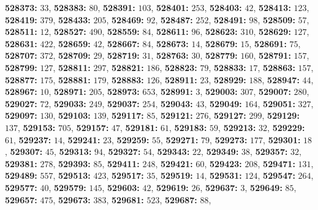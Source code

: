 \textsf{\bfseries 528373:} $33$, \textsf{\bfseries 528383:} $80$, \textsf{\bfseries 528391:} $103$, \textsf{\bfseries 528401:} $253$, \textsf{\bfseries 528403:} $42$, \textsf{\bfseries 528413:} $123$, \textsf{\bfseries 528419:} $379$, \textsf{\bfseries 528433:} $205$, \textsf{\bfseries 528469:} $92$, \textsf{\bfseries 528487:} $252$, \textsf{\bfseries 528491:} $98$, \textsf{\bfseries 528509:} $57$, \textsf{\bfseries 528511:} $12$, \textsf{\bfseries 528527:} $490$, \textsf{\bfseries 528559:} $84$, \textsf{\bfseries 528611:} $96$, \textsf{\bfseries 528623:} $310$, \textsf{\bfseries 528629:} $127$, \textsf{\bfseries 528631:} $422$, \textsf{\bfseries 528659:} $42$, \textsf{\bfseries 528667:} $84$, \textsf{\bfseries 528673:} $14$, \textsf{\bfseries 528679:} $15$, \textsf{\bfseries 528691:} $75$, \textsf{\bfseries 528707:} $372$, \textsf{\bfseries 528709:} $29$, \textsf{\bfseries 528719:} $31$, \textsf{\bfseries 528763:} $30$, \textsf{\bfseries 528779:} $160$, \textsf{\bfseries 528791:} $157$, \textsf{\bfseries 528799:} $127$, \textsf{\bfseries 528811:} $297$, \textsf{\bfseries 528821:} $186$, \textsf{\bfseries 528823:} $79$, \textsf{\bfseries 528833:} $17$, \textsf{\bfseries 528863:} $157$, \textsf{\bfseries 528877:} $175$, \textsf{\bfseries 528881:} $179$, \textsf{\bfseries 528883:} $126$, \textsf{\bfseries 528911:} $23$, \textsf{\bfseries 528929:} $188$, \textsf{\bfseries 528947:} $44$, \textsf{\bfseries 528967:} $10$, \textsf{\bfseries 528971:} $205$, \textsf{\bfseries 528973:} $653$, \textsf{\bfseries 528991:} $3$, \textsf{\bfseries 529003:} $307$, \textsf{\bfseries 529007:} $280$, \textsf{\bfseries 529027:} $72$, \textsf{\bfseries 529033:} $249$, \textsf{\bfseries 529037:} $254$, \textsf{\bfseries 529043:} $43$, \textsf{\bfseries 529049:} $164$, \textsf{\bfseries 529051:} $327$, \textsf{\bfseries 529097:} $130$, \textsf{\bfseries 529103:} $139$, \textsf{\bfseries 529117:} $85$, \textsf{\bfseries 529121:} $276$, \textsf{\bfseries 529127:} $299$, \textsf{\bfseries 529129:} $137$, \textsf{\bfseries 529153:} $705$, \textsf{\bfseries 529157:} $47$, \textsf{\bfseries 529181:} $61$, \textsf{\bfseries 529183:} $59$, \textsf{\bfseries 529213:} $32$, \textsf{\bfseries 529229:} $61$, \textsf{\bfseries 529237:} $14$, \textsf{\bfseries 529241:} $23$, \textsf{\bfseries 529259:} $55$, \textsf{\bfseries 529271:} $79$, \textsf{\bfseries 529273:} $177$, \textsf{\bfseries 529301:} $18$, \textsf{\bfseries 529307:} $45$, \textsf{\bfseries 529313:} $94$, \textsf{\bfseries 529327:} $54$, \textsf{\bfseries 529343:} $22$, \textsf{\bfseries 529349:} $38$, \textsf{\bfseries 529357:} $32$, \textsf{\bfseries 529381:} $278$, \textsf{\bfseries 529393:} $85$, \textsf{\bfseries 529411:} $248$, \textsf{\bfseries 529421:} $60$, \textsf{\bfseries 529423:} $208$, \textsf{\bfseries 529471:} $131$, \textsf{\bfseries 529489:} $557$, \textsf{\bfseries 529513:} $423$, \textsf{\bfseries 529517:} $35$, \textsf{\bfseries 529519:} $14$, \textsf{\bfseries 529531:} $124$, \textsf{\bfseries 529547:} $264$, \textsf{\bfseries 529577:} $40$, \textsf{\bfseries 529579:} $145$, \textsf{\bfseries 529603:} $42$, \textsf{\bfseries 529619:} $26$, \textsf{\bfseries 529637:} $3$, \textsf{\bfseries 529649:} $85$, \textsf{\bfseries 529657:} $475$, \textsf{\bfseries 529673:} $383$, \textsf{\bfseries 529681:} $523$, \textsf{\bfseries 529687:} $88$, 
